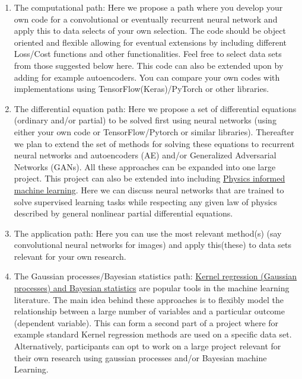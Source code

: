 \documentclass[%
oneside,                 %
final,                   %
10pt]{article}
\begin{document}
\begin{enumerate}
\item The computational path: Here we propose a path where you develop your own code for a convolutional or eventually recurrent neural network and apply this to data selects of your own selection. The code should be object oriented and flexible allowing for eventual extensions by including different Loss/Cost functions and other functionalities. Feel free to select data sets from those suggested below here. This code can also be extended upon by adding for example autoencoders. You can compare your own codes with implementations using TensorFlow(Keras)/PyTorch or other libraries.

\item The differential equation path: Here we propose a set of differential equations (ordinary and/or partial) to be solved first using neural networks (using either your own code or TensorFlow/Pytorch or similar libraries). Thereafter we plan to extend the set of methods for solving these equations to recurrent neural networks and autoencoders (AE) and/or Generalized Adversarial Networks (GANs). All these approaches can be expanded into one large project. This project can also be extended into including \href{{https://github.com/maziarraissi/PINNs}}{Physics informed machine learning}. Here we can discuss neural networks that are trained to solve supervised learning tasks while respecting any given law of physics described by general nonlinear partial differential equations. 

\item The application path: Here you can use the most relevant method(s) (say convolutional neural networks for images) and apply this(these) to data sets relevant for your own research.

\item The Gaussian processes/Bayesian statistics path: \href{{https://jenfb.github.io/bkmr/overview.html}}{Kernel regression (Gaussian processes) and Bayesian statistics} are  popular tools in the machine learning literature. The main idea behind these approaches is to flexibly model the relationship between a large number of variables and a particular outcome (dependent variable). This can form a second part of a project where for example standard Kernel regression methods are used on a specific data set. Alternatively, participants can opt to work on a large project relevant for their own research using gaussian processes and/or Bayesian machine Learning. 
\end{enumerate}
\end{document}
